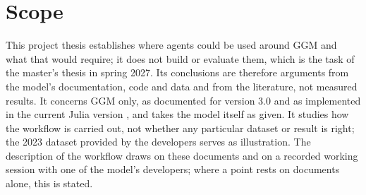 \section{Scope}

This project thesis establishes where agents could be used around GGM and what that would require; it does not build or evaluate them, which is the task of the master's thesis in spring 2027.
Its conclusions are therefore arguments from the model's documentation, code and data and from the literature, not measured results.
It concerns GGM only, as documented for version 3.0 \citep{egging2019global} and as implemented in the current Julia version \citep{ggmpublicongithubndggm}, and takes the model itself as given.
It studies how the workflow is carried out, not whether any particular dataset or result is right; the 2023 dataset provided by the developers serves as illustration.
The description of the workflow draws on these documents and on a recorded working session with one of the model's developers; where a point rests on documents alone, this is stated.
